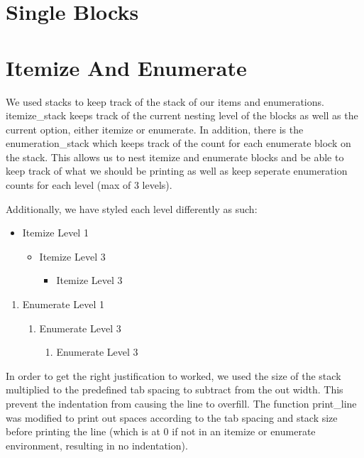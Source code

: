 \section{Single Blocks}

\section{Itemize And Enumerate}
We used stacks to keep track of the stack of our items and enumerations. itemize_stack
keeps track of the current nesting level of the blocks as well as the current option, 
either itemize or enumerate. In addition, there is the enumeration_stack which keeps
track of the count for each enumerate block on the stack. This allows us to nest
itemize and enumerate blocks and be able to keep track of what we should be printing
as well as keep seperate enumeration counts for each level (max of 3 levels).

Additionally, we have styled each level differently as such:

\begin{itemize}
\item Itemize Level 1
\begin{itemize}
\item Itemize Level 3
\begin{itemize}
\item Itemize Level 3
\end{itemize}
\end{itemize}
\end{itemize}
\begin{enumerate}
\item Enumerate Level 1
\begin{enumerate}
\item Enumerate Level 3
\begin{enumerate}
\item Enumerate Level 3
\end{enumerate}
\end{enumerate}
\end{enumerate}

In order to get the right justification to worked, we used the size of the stack multiplied
to the predefined tab spacing to subtract from the out width. This prevent the indentation
from causing the line to overfill. The function print_line was modified to print out spaces
according to the tab spacing and stack size before printing the line (which is at 0 if not
in an itemize or enumerate environment, resulting in no indentation).

